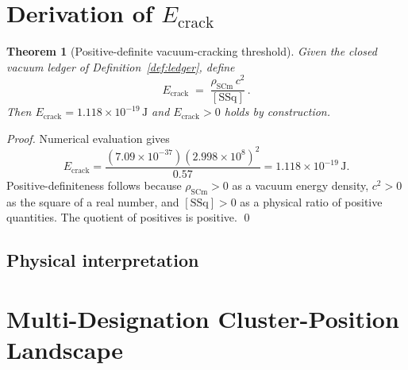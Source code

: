 \documentclass[11pt,a4paper,onecolumn]{article}
\theoremstyle{plain}
\newtheorem{theorem}{Theorem}
\theoremstyle{definition}
\theoremstyle{remark}
\begin{document}
\section{Derivation of $E_{\text{crack}}$}\label{sec:derivation}

\begin{theorem}[Positive-definite vacuum-cracking threshold]
\label{thm:e_crack_positive}
Given the closed vacuum ledger of Definition~\ref{def:ledger}, define
\begin{equation}\label{eq:e_crack}
E_{\text{crack}} \;=\; \frac{\rho_{\mathrm{SCm}} \, c^2}{[\mathrm{SSq}]}\,.
\end{equation}
Then $E_{\text{crack}} = 1.118 \times 10^{-19}\,\mathrm{J}$ and
$E_{\text{crack}} > 0$ holds by construction.
\end{theorem}

\begin{proof}
Numerical evaluation gives
\[
E_{\text{crack}}
  = \frac{(7.09 \times 10^{-37})(2.998 \times 10^8)^2}{0.57}
  = 1.118 \times 10^{-19}\,\mathrm{J}.
\]
Positive-definiteness follows because $\rho_{\mathrm{SCm}} > 0$ as a
vacuum energy density, $c^2 > 0$ as the square of a real number, and
$[\mathrm{SSq}] > 0$ as a physical ratio of positive quantities.
The quotient of positives is positive.
\qed
\end{proof}

\subsection{Physical interpretation}

\section{Multi-Designation Cluster-Position Landscape}\label{sec:clusters}

\end{document}
